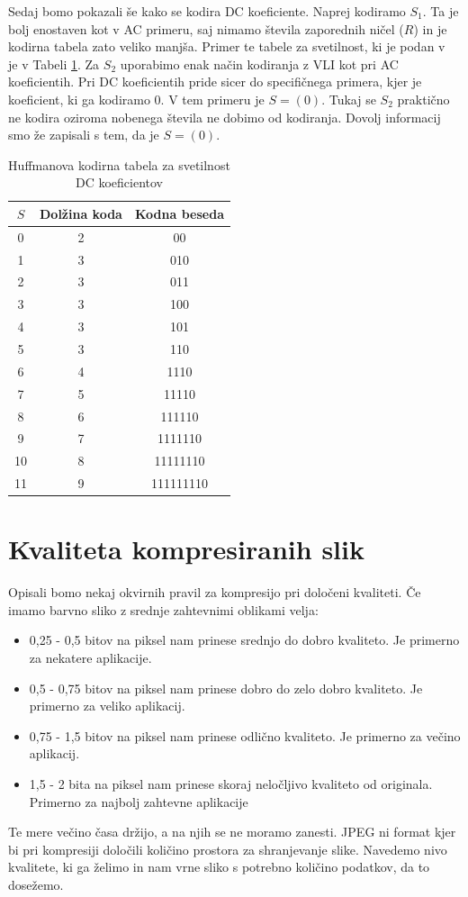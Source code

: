 \documentclass[a4paper,12pt,openright]{book}
\begin{document}
Sedaj bomo pokazali še kako se kodira DC koeficiente. Naprej kodiramo $S_1$. Ta je bolj enostaven kot v AC primeru, saj nimamo števila zaporednih ničel ($R$) in je kodirna tabela zato veliko manjša. Primer te tabele za svetilnost, ki je podan v~\cite{ISO/IEC_10918-1} je v Tabeli \ref{tab:Huffman_DC_luminance}. Za $S_2$ uporabimo enak način kodiranja z VLI kot pri AC koeficientih. Pri DC koeficientih pride sicer do specifičnega primera, kjer je koeficient, ki ga kodiramo 0. V tem primeru je $S = (0)$. Tukaj se $S_2$ praktično ne kodira oziroma nobenega števila ne dobimo od kodiranja. Dovolj informacij smo že zapisali s tem, da je $S = (0)$. 

\begin{table}[ht]
\centering
\begin{tabular}{|c|c|c|}
\hline
$S$&Dolžina koda&Kodna beseda\\
\hline
0&  2& 00\\
1&  3& 010\\
2&  3& 011\\
3&  3& 100\\
4&  3& 101\\
5&  3& 110\\
6&  4& 1110\\
7&  5& 11110\\
8&  6& 111110\\
9&  7& 1111110\\
10& 8& 11111110\\
11& 9& 111111110\\
\hline
\end{tabular}
\caption{Huffmanova kodirna tabela za svetilnost DC koeficientov}
\label{tab:Huffman_DC_luminance}
\end{table}

\section{Kvaliteta kompresiranih slik}
Opisali bomo nekaj okvirnih pravil za kompresijo pri določeni kvaliteti. Če imamo barvno sliko z srednje zahtevnimi oblikami velja:
\begin{itemize}
   \item 0,25 - 0,5 bitov na piksel nam prinese srednjo do dobro kvaliteto. Je primerno za nekatere aplikacije.
   \item 0,5 - 0,75 bitov na piksel nam prinese dobro do zelo dobro kvaliteto. Je primerno za veliko aplikacij.
   \item 0,75 - 1,5 bitov na piksel nam prinese odlično kvaliteto. Je primerno za večino aplikacij.
   \item 1,5 - 2 bita na piksel nam prinese skoraj neločljivo kvaliteto od originala. Primerno za najbolj zahtevne aplikacije
\end{itemize}
Te mere večino časa držijo, a na njih se ne moramo zanesti. JPEG ni format kjer bi pri kompresiji določili količino prostora za shranjevanje slike. Navedemo nivo kvalitete, ki ga želimo in nam vrne sliko s potrebno količino podatkov, da to dosežemo.
\end{document}
